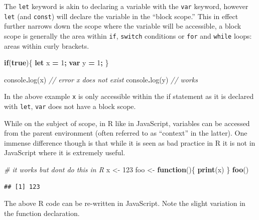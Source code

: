 \documentclass[
]{krantz}
\makeatletter
\newenvironment{Shaded}{\begin{snugshade}}{\end{snugshade}}
\newcommand{\BuiltInTok}[1]{#1}
\newcommand{\CommentTok}[1]{\textcolor[rgb]{0.37,0.37,0.37}{\textit{#1}}}
\newcommand{\ControlFlowTok}[1]{\textcolor[rgb]{0.27,0.27,0.27}{\textbf{#1}}}
\newcommand{\DecValTok}[1]{\textcolor[rgb]{0.06,0.06,0.06}{#1}}
\newcommand{\FunctionTok}[1]{\textcolor[rgb]{0,0,0}{#1}}
\newcommand{\KeywordTok}[1]{\textcolor[rgb]{0.27,0.27,0.27}{\textbf{#1}}}
\newcommand{\NormalTok}[1]{#1}
\newcommand{\OperatorTok}[1]{\textcolor[rgb]{0.43,0.43,0.43}{\textbf{#1}}}
\newcommand{\StringTok}[1]{\textcolor[rgb]{0.5,0.5,0.5}{#1}}
\newenvironment{kframe}{%
\medskip{}
\setlength{\fboxsep}{.8em}
 \def\at@end@of@kframe{}%
 \ifinner\ifhmode%
  \def\at@end@of@kframe{\end{minipage}}%
  \begin{minipage}{\columnwidth}%
 \fi\fi%
 \def\FrameCommand##1{\hskip\@totalleftmargin \hskip-\fboxsep
 \colorbox{shadecolor}{##1}\hskip-\fboxsep
     \hskip-\linewidth \hskip-\@totalleftmargin \hskip\columnwidth}%
 \MakeFramed {\advance\hsize-\width
   \@totalleftmargin\z@ \linewidth\hsize
   \@setminipage}}%
 {\par\unskip\endMakeFramed%
 \at@end@of@kframe}
\renewenvironment{Shaded}{\begin{kframe}}{\end{kframe}}
\makeatother
\begin{document}
The \texttt{let} keyword is akin to declaring a variable with the \texttt{var} keyword, however \texttt{let} (and \texttt{const}) will declare the variable in the ``block scope.'' This in effect further narrows down the scope where the variable will be accessible, a block scope is generally the area within \texttt{if}, \texttt{switch} conditions or \texttt{for} and \texttt{while} loops: areas within curly brackets.

\begin{Shaded}
\begin{Highlighting}[]
\ControlFlowTok{if}\NormalTok{(}\KeywordTok{true}\NormalTok{)\{}
  \KeywordTok{let}\NormalTok{ x }\OperatorTok{=} \DecValTok{1}\OperatorTok{;}
  \KeywordTok{var}\NormalTok{ y }\OperatorTok{=} \DecValTok{1}\OperatorTok{;}
\NormalTok{\}}

\BuiltInTok{console}\OperatorTok{.}\FunctionTok{log}\NormalTok{(x) }\CommentTok{// error x does not exist}
\BuiltInTok{console}\OperatorTok{.}\FunctionTok{log}\NormalTok{(y) }\CommentTok{// works}
\end{Highlighting}
\end{Shaded}

In the above example \texttt{x} is only accessible within the if statement as it is declared with \texttt{let}, \texttt{var} does not have a block scope.

While on the subject of scope, in R like in JavaScript, variables can be accessed from the parent environment (often referred to as ``context'' in the latter). One immense difference though is that while it is seen as bad practice in R it is not in JavaScript where it is extremely useful.

\begin{Shaded}
\begin{Highlighting}[]
\CommentTok{\# it works but don\textquotesingle{}t do this in R}
\NormalTok{x \textless{}{-}}\StringTok{ }\DecValTok{123}
\NormalTok{foo \textless{}{-}}\StringTok{ }\ControlFlowTok{function}\NormalTok{()\{}
  \KeywordTok{print}\NormalTok{(x)}
\NormalTok{\}}
\KeywordTok{foo}\NormalTok{()}
\end{Highlighting}
\end{Shaded}

\begin{verbatim}
## [1] 123
\end{verbatim}

The above R code can be re-written in JavaScript. Note the slight variation in the function declaration.
\end{document}
